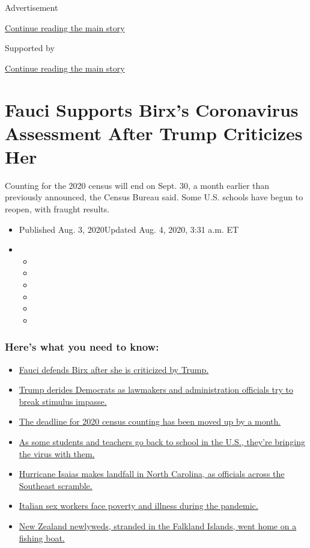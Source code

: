 Advertisement

\protect\hyperlink{after-top}{Continue reading the main story}

Supported by

\protect\hyperlink{after-sponsor}{Continue reading the main story}

\hypertarget{fauci-supports-birxs-coronavirus-assessment-after-trump-criticizes-her}{%
\section{Fauci Supports Birx's Coronavirus Assessment After Trump
Criticizes
Her}\label{fauci-supports-birxs-coronavirus-assessment-after-trump-criticizes-her}}

Counting for the 2020 census will end on Sept. 30, a month earlier than
previously announced, the Census Bureau said. Some U.S. schools have
begun to reopen, with fraught results.

\begin{itemize}
\item
  Published Aug. 3, 2020Updated Aug. 4, 2020, 3:31 a.m. ET
\item
  \begin{itemize}
  \item
  \item
  \item
  \item
  \item
  \item
  \end{itemize}
\end{itemize}

\hypertarget{heres-what-you-need-to-know}{%
\subsubsection{Here's what you need to
know:}\label{heres-what-you-need-to-know}}

\begin{itemize}
\tightlist
\item
  \protect\hyperlink{link-4547638f}{Fauci defends Birx after she is
  criticized by Trump.}
\item
  \protect\hyperlink{link-15e7f995}{Trump derides Democrats as lawmakers
  and administration officials try to break stimulus impasse.}
\item
  \protect\hyperlink{link-e5a2cda}{The deadline for 2020 census counting
  has been moved up by a month.}
\item
  \protect\hyperlink{link-4c85ed64}{As some students and teachers go
  back to school in the U.S., they're bringing the virus with them.}
\item
  \protect\hyperlink{link-5ccc012}{Hurricane Isaias makes landfall in
  North Carolina, as officials across the Southeast scramble.}
\item
  \protect\hyperlink{link-6bfd36ea}{Italian sex workers face poverty and
  illness during the pandemic.}
\item
  \protect\hyperlink{link-bfeb498}{New Zealand newlyweds, stranded in
  the Falkland Islands, went home on a fishing boat.}
\end{itemize}

